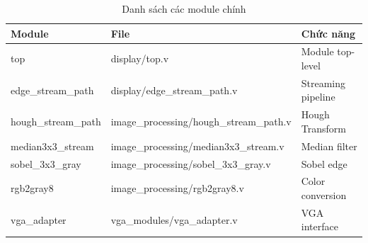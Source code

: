\documentclass[12pt,a4paper]{report}
\begin{document}
\begin{table}[h]
\centering
\small
\begin{tabular}{|l|l|l|}
\hline
\textbf{Module} & \textbf{File} & \textbf{Chức năng} \\
\hline
top & display/top.v & Module top-level \\
edge\_stream\_path & display/edge\_stream\_path.v & Streaming pipeline \\
hough\_stream\_path & image\_processing/hough\_stream\_path.v & Hough Transform \\
median3x3\_stream & image\_processing/median3x3\_stream.v & Median filter \\
sobel\_3x3\_gray & image\_processing/sobel\_3x3\_gray.v & Sobel edge \\
rgb2gray8 & image\_processing/rgb2gray8.v & Color conversion \\
vga\_adapter & vga\_modules/vga\_adapter.v & VGA interface \\
\hline
\end{tabular}
\caption{Danh sách các module chính}
\end{table}
\end{document}
